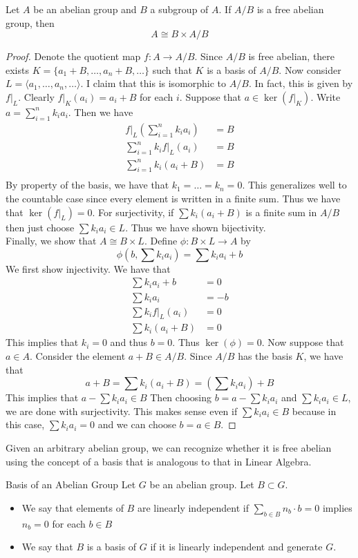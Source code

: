 \documentclass[a4paper]{article}
\begin{document}
\begin{prp}{}{} Let $A$ be an abelian group and $B$ a subgroup of $A$. If $A/B$ is a free abelian group, then $$A\cong B\times A/B$$ 
\begin{proof}
Denote the quotient map $f:A\to A/B$. Since $A/B$ is free abelian, there exists $K=\{a_1+B,\dots,a_n+B,\dots\}$ such that $K$ is a basis of $A/B$. Now consider $L=\langle a_1,\dots,a_n,\dots\rangle$. I claim that this is isomorphic to $A/B$. In fact, this is given by $f|_L$. Clearly $f|_K(a_i)=a_i+B$ for each $i$. Suppose that $a\in\ker(f|_K)$. Write $a=\sum_{i=1}^nk_ia_i$. Then we have 
\begin{align*}
f|_L\left(\sum_{i=1}^nk_ia_i\right)&=B\\
\sum_{i=1}^nk_if|_L(a_i)&=B\\
\sum_{i=1}^nk_i(a_i+B)&=B\\
\end{align*}
By property of the basis, we have that $k_1=\dots=k_n=0$. This generalizes well to the countable case since every element is written in a finite sum. Thus we have that $\ker(f|_L)=0$. For surjectivity, if $\sum k_i(a_i+B)$ is a finite sum in $A/B$ then just choose $\sum k_ia_i\in L$. Thus we have shown bijectivity. \\
Finally, we show that $A\cong B\times L$. Define $\phi:B\times L\to A$ by $$\phi\left(b,\sum k_ia_i\right)=\sum k_ia_i+b$$ We first show injectivity. We have that 
\begin{align*}
\sum k_ia_i+b&=0\\
\sum k_ia_i&=-b\\
\sum k_if|_L(a_i)&=0\\
\sum k_i(a_i+B)&=0
\end{align*}
This implies that $k_i=0$ and thus $b=0$. Thus $\ker(\phi)=0$. Now suppose that $a\in A$. Consider the element $a+B\in A/B$. Since $A/B$ has the basis $K$, we have that $$a+B=\sum k_i(a_i+B)=\left(\sum k_ia_i\right)+B$$ This implies that $a-\sum k_ia_i\in B$ Then choosing $b=a-\sum k_ia_i$ and $\sum k_ia_i\in L$, we are done with surjectivity. This makes sense even if $\sum k_ia_i\in B$ because in this case, $\sum k_ia_i=0$ and we can choose $b=a\in B$. 
\end{proof}
\end{prp}

Given an arbitrary abelian group, we can recognize whether it is free abelian using the concept of a basis that is analogous to that in Linear Algebra. 

\begin{defn}{Basis of an Abelian Group}{} Let $G$ be an abelian group. Let $B\subset G$. 
\begin{itemize}
\item We say that elements of $B$ are linearly independent if $\sum_{b\in B}n_b\cdot b=0$ implies $n_b=0$ for each $b\in B$
\item We say that $B$ is a basis of $G$ if it is linearly independent and generate $G$. 
\end{itemize}
\end{defn}
\end{document}
